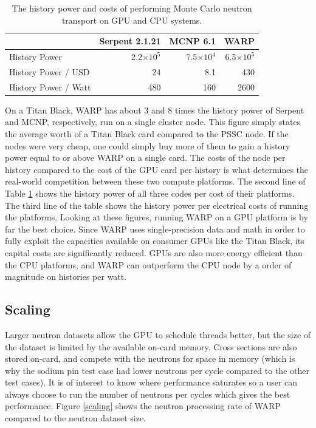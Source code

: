 \documentclass[preprint,12pt]{elsarticle}
\begin{document}
\begin{table}[h]
\centering
\caption{The history power and costs of performing Monte Carlo neutron transport on GPU and CPU systems.}
\label{history_power}
\small
\begin{tabular}{| l | r | r | r |}
\hline
              &  Serpent 2.1.21 & MCNP 6.1 & WARP  \\
\hline
History Power   &  2.2$\times10^5$	 & 7.5$\times10^4$	 & 6.5$\times10^5$    \\
\hline
History Power / USD    & 24 & 	8.1	 & 430    \\
\hline
History Power / Watt   & 480	 & 160	 & 2600    \\
\hline
\end{tabular}
\end{table}

On a Titan Black, WARP has about 3 and 8 times the history power of Serpent and MCNP, respectively, run on a single cluster node.    This figure simply states the average worth of a Titan Black card compared to the PSSC node.  If the nodes were very cheap, one could simply buy more of them to gain a history power equal to or above WARP on a single card.  The costs of the node per history compared to the cost of the GPU card per history is what determines the real-world competition between these two compute platforms.  The second line of Table \ref{history_power} shows the history power of all three codes per cost of their platforms.  The third line of the table shows the history power per electrical costs of running the platforms.  Looking at these figures, running WARP on a GPU platform is by far the best choice.  Since WARP uses single-precision data and math in order to fully exploit the capacities available on consumer GPUs like the Titan Black, its capital costs are significantly reduced.  GPUs are also more energy efficient than the CPU platforms, and WARP can outperform the CPU node by a order of magnitude on histories per watt.

\subsection{Scaling}

Larger neutron datasets allow the GPU to schedule threads better, but the size of the dataset is limited by the available on-card memory.  Cross sections are also stored on-card, and compete with the neutrons for space in memory (which is why the sodium pin test case had lower neutrons per cycle compared to the other test cases).  It is of interest to know where performance saturates so a user can always choose to run the number of neutrons per cycles which gives the best performance.  Figure \ref{scaling} shows the neutron processing rate of WARP compared to the neutron dataset size.
\end{document}
